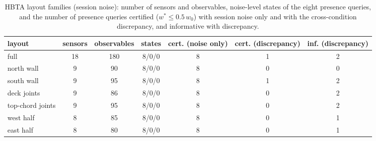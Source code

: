 \begin{table}[h]\centering\footnotesize
\caption{HBTA layout families (session noise): number of sensors and observables, noise-level states of the eight presence queries, and the number of presence queries certified ($w^{*}\le0.5\,w_0$) with session noise only and with the cross-condition discrepancy, and informative with discrepancy.}\label{tab:s11}
\begin{tabular}{lcccccc}\toprule layout & sensors & observables & states & cert. (noise only) & cert. (discrepancy) & inf. (discrepancy)\\ \midrule
full & 18 & 180 & 8/0/0 & 8 & 1 & 2 \\
north wall & 9 & 90 & 8/0/0 & 8 & 0 & 0 \\
south wall & 9 & 95 & 8/0/0 & 8 & 1 & 2 \\
deck joints & 9 & 86 & 8/0/0 & 8 & 0 & 2 \\
top-chord joints & 9 & 95 & 8/0/0 & 8 & 0 & 2 \\
west half & 8 & 85 & 8/0/0 & 8 & 0 & 1 \\
east half & 8 & 80 & 8/0/0 & 8 & 0 & 1 \\
\bottomrule\end{tabular}\end{table}